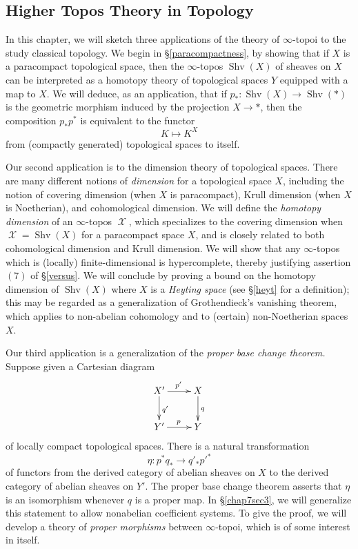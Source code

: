 \documentclass{report}[10pt, final]
\DeclareMathOperator{\Shv}{Shv}
\DeclareMathOperator{\calX}{\mathcal{X}}
\theoremstyle{definition}
\begin{document}
\begin{Didn't Read}






\chapter{Higher Topos Theory in Topology}\label{chap7}

\setcounter{theorem}{0}
\setcounter{subsection}{0}


In this chapter, we will sketch three applications of the theory of $\infty$-topoi to the study classical topology. We begin in \S \ref{paracompactness}, by showing that if $X$ is a paracompact topological space, then the $\infty$-topos $\Shv(X)$ of sheaves on $X$ can be interpreted as a homotopy theory of topological spaces $Y$ equipped with a map to $X$. We will deduce, as an application, that if $p_{\ast}: \Shv(X) \rightarrow \Shv(\ast)$ is the geometric morphism induced by the projection $X \rightarrow \ast$, then the composition $p_{\ast} p^{\ast}$ is equivalent to the functor $$K \mapsto K^X$$ from (compactly generated) topological spaces to itself.

Our  second application is to the dimension theory of topological spaces. There are many different notions of {\it dimension} for a topological space $X$, including the notion of covering dimension (when $X$ is paracompact), Krull dimension (when $X$ is Noetherian), and cohomological dimension. We will define the {\it homotopy dimension} of an $\infty$-topos $\calX$, which specializes to the covering dimension when $\calX = \Shv(X)$ for a paracompact space $X$, and is closely related to both cohomological dimension and Krull dimension. We will show that any $\infty$-topos which is (locally) finite-dimensional is hypercomplete, thereby justifying assertion $(7)$ of \S \ref{versus}. We will conclude by proving a bound on the homotopy dimension of $\Shv(X)$ where $X$ is a {\it Heyting space} (see \S \ref{heyt} for a definition); this may be regarded as a generalization of Grothendieck's vanishing theorem, which applies to non-abelian cohomology and to (certain) non-Noetherian spaces $X$.

Our third application is a generalization of the {\em proper base change theorem.}
Suppose given a Cartesian diagram
$$ \xymatrix{ X' \ar[r]^{p'} \ar[d]^{q'} & X \ar[d]^{q} \\
Y' \ar[r]^{p} & Y}$$
of locally compact topological spaces.
There is a natural transformation
$$ \eta: p^{\ast} q_{\ast} \rightarrow q'_{\ast} {p'}^{\ast}$$
of functors from the derived category of abelian sheaves on $X$ to the derived category of abelian sheaves on $Y'$. The proper base change theorem asserts that $\eta$ is an isomorphism whenever $q$ is a proper map. In \S \ref{chap7sec3}, we will generalize this statement to allow nonabelian coefficient systems. To give the proof, we will develop a theory of {\it proper morphisms} between $\infty$-topoi, which is of some interest in itself.




\end{Didn't Read}
\end{document}
